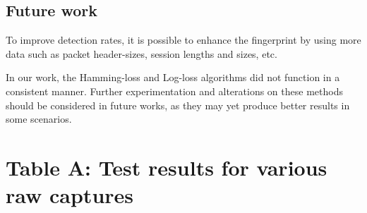 \documentclass[13pt,journal,compsoc,onecolumn]{IEEEtran}
\begin{document}
\subsection{Future work}
To improve detection rates, it is possible to enhance the fingerprint by using more data such as packet header-sizes, session lengths and sizes, etc.

In our work, the Hamming-loss and Log-loss algorithms did not function in a consistent manner. Further experimentation and alterations on these methods should be considered in future works, as they may yet produce better results in some scenarios.
\newpage
\appendix
\section*{Table A: Test results for various raw captures}
\label{table:testresults}
\end{document}
